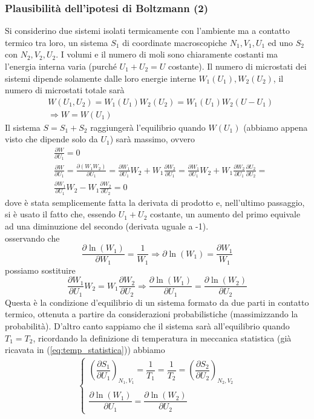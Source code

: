 \documentclass[
10pt, %
a4paper, %
oneside, %
headinclude,footinclude, %
BCOR5mm, %
]{scrartcl}
\begin{document}
\subsubsection*{Plausibilità dell'ipotesi di Boltzmann (2)}
Si considerino due sistemi isolati termicamente con l'ambiente ma a contatto termico tra loro, un sistema \(S_1\) di coordinate macroscopiche \(N_1, V_1, U_1\) ed uno \(S_2\) con \(N_2,V_2,U_2\). I volumi e il numero di moli sono chiaramente costanti ma l'energia interna varia (purché \(U_1+U_2 = U\) costante). Il numero di microstati dei sistemi dipende solamente dalle loro energie interne \(W_1(U_1), W_2(U_2)\), il numero di microstati totale sarà 
\begin{align*}
	&W(U_1,U_2) = W_1(U_1)W_2(U_2)=W_1(U_1)W_2(U-U_1)\\
	&\Rightarrow W = W(U_1)
\end{align*} 
Il sistema \(S=S_1+S_2\) raggiungerà l'equilibrio quando \(W(U_1)\) (abbiamo appena visto che dipende solo da \(U_1\)) sarà massimo, ovvero
\begin{align*}
	&\frac{\partial W}{\partial U_1}=0\\
	&\frac{\partial W}{\partial U_1}=\frac{\partial (W_1W_2)}{\partial U_1}=\frac{\partial W_1}{\partial U_1}W_2+W_1\frac{\partial W_2}{\partial U_1}=\frac{\partial W_1}{\partial U_1}W_2+W_1\frac{\partial W_2}{\partial U_1}\frac{\partial U_2}{\partial U_2}=\\
	&\frac{\partial W_1}{\partial U_1}W_2-W_1\frac{\partial W_2}{\partial U_2}=0
\end{align*} 
dove è stata semplicemente fatta la derivata di prodotto e, nell'ultimo passaggio, si è usato il fatto che, essendo \(U_1+U_2 \) costante, un aumento del primo equivale ad una diminuzione del secondo (derivata uguale a -1).\\
osservando che 
\[\frac{\partial \ln(W_1)}{\partial W_1}=\frac{1}{W_1}\Rightarrow \partial \ln(W_1)=\frac{\partial W_1}{W_1}\]
possiamo sostituire 
\[\frac{\partial W_1}{\partial U_1}W_2 = W_1\frac{\partial W_2}{\partial U_2} \Rightarrow \frac{\partial \ln(W_1)}{\partial U_1} = \frac{\partial \ln(W_2)}{\partial U_2}\]
Questa è la condizione d'equilibrio di un sistema formato da due parti in contatto termico, ottenuta a partire da considerazioni probabilistiche (massimizzando la probabilità). D'altro canto sappiamo che il sistema sarà all'equilibrio quando \(T_1 = T_2\), ricordando la definizione di temperatura in meccanica statistica (già ricavata in (\ref{eq:temp_statistica})) abbiamo 
\begin{align*}
	\begin{cases}
		\left(\dfrac{\partial S_1}{\partial U_1}\right)_{N_1, V_1} = \dfrac{1}{T_1} = \dfrac{1}{T_2} = \left(\dfrac{\partial S_2}{\partial U_2}\right)_{N_2, V_2}\\\\
		\dfrac{\partial \ln(W_1)}{\partial U_1} = \dfrac{\partial \ln(W_2)}{\partial U_2}
	\end{cases}
\end{align*}
\end{document}
